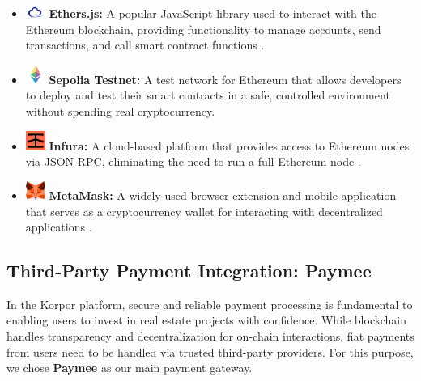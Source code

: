 \begin{itemize}
\begin{itemize}
    \item \includegraphics[width=0.05\textwidth]{images/icons/etherscan.png} \textbf{Ethers.js:} A popular JavaScript library used to interact with the Ethereum blockchain, providing functionality to manage accounts, send transactions, and call smart contract functions \cite{EthersJSDocs}.
    
    \item \includegraphics[width=0.05\textwidth]{images/icons/sepolia.png} \textbf{Sepolia Testnet:} A test network for Ethereum that allows developers to deploy and test their smart contracts in a safe, controlled environment without spending real cryptocurrency.
    
    \item \includegraphics[width=0.05\textwidth]{images/icons/infura.png} \textbf{Infura:} A cloud-based platform that provides access to Ethereum nodes via JSON-RPC, eliminating the need to run a full Ethereum node \cite{InfuraWeb3}.
    
    \item \includegraphics[width=0.05\textwidth]{images/icons/metamask.png} \textbf{MetaMask:} A widely-used browser extension and mobile application that serves as a cryptocurrency wallet for interacting with decentralized applications \cite{MetaMaskDocs}.
   \end{itemize}
\end{itemize}

\subsection{Third-Party Payment Integration: Paymee}

In the Korpor platform, secure and reliable payment processing is fundamental to enabling users to invest in real estate projects with confidence. While blockchain handles transparency and decentralization for on-chain interactions, fiat payments from users need to be handled via trusted third-party providers. For this purpose, we chose \textbf{Paymee} as our main payment gateway.

